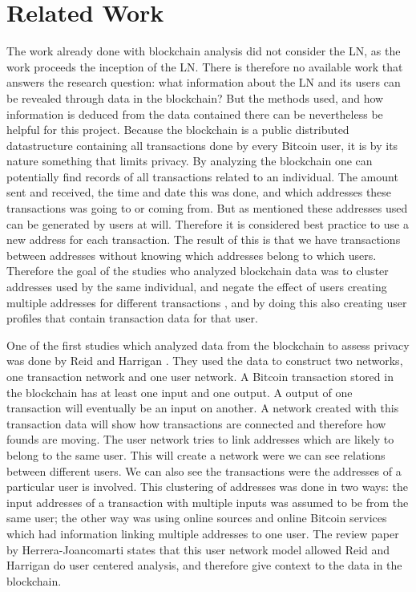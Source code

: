 \section{Related Work}

The work already done with blockchain analysis did not consider the LN, as the work proceeds the inception of the LN. There is therefore no available work that answers the research question: what information about the LN and its users can be revealed through data in the blockchain?
But the methods used, and how information is deduced from the data contained there can be nevertheless be helpful for this project.
Because the blockchain is a public distributed datastructure containing all transactions done by every Bitcoin user, it is by its nature something that limits privacy. By analyzing the blockchain one can potentially find records of all transactions related to an individual. The amount sent and received, the time and date this was done, and which addresses these transactions was going to or coming from. But as mentioned these addresses used can be generated by users at will. Therefore it is considered best practice to use a new address for each transaction. The result of this is that we have transactions between addresses without knowing which addresses belong to which users. Therefore the goal of the studies who analyzed blockchain data was to cluster addresses used by the same individual, and negate the effect of users creating multiple addresses for different transactions \cite{herrera2015research}, and by doing this also creating user profiles that contain transaction data for that user.

One of the first studies which analyzed data from the blockchain to assess privacy was done by Reid and Harrigan \cite{reid2013analysis}.
They used the data to construct two networks, one transaction network and one user network. A Bitcoin transaction stored in the blockchain has at least one input and one output. A output of one transaction will eventually be an input on another. A network created with this transaction data will show how transactions are connected and therefore how founds are moving. The user network tries to link addresses which are likely to belong to the same user. This will create a network were we can see relations between different users. We can also see the transactions were the addresses of a particular user is involved. This clustering of addresses was done in two ways: the input addresses of a transaction with multiple inputs was assumed to be from the same user; the other way was using online sources and online Bitcoin services which had information linking multiple addresses to one user. The review paper by Herrera-Joancomart\́i\cite{herrera2015research} states that this user network model allowed Reid and Harrigan do user centered analysis, and therefore give context to the data in the blockchain.

